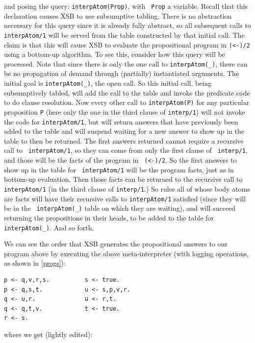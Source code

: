 \noindent and posing the query: {\tt interpAtom(Prop)}, with {\tt
  Prop} a variable.  Recall that this declaration causes XSB to use
subsumptive tabling.  There is no abstraction necessary for this query
since it is already fully abstract, so all subsequent calls to {\tt
  interpAtom/1} will be served from the table constructed by that
initial call.  The claim is that this will cause XSB to evaluate the
propositional program in {\tt (<-)/2} using a bottom-up algorithm.  To
see this, consider how this query will be processed.  Note that since
there is only the one call to {\tt interpAtom(\_)}, there can be no
propagation of demand through (partially) instantiated arguments.  The
initial goal is {\tt interpAtom(\_)}, the open call.  So this initial
call, being subsumptively tabled, will add the call to the table and
invoke the predicate code to do clause resolution.  Now every other
call to {\tt interpAtom(P)} for any particular proposition {\tt P}
(here only the one in the third clause of {\tt interp/1}) will not
invoke the code for {\tt interpAtom/1}, but will return answers that
have previously been added to the table and will suspend waiting for a
new answer to show up in the table to then be returned.  The first
answers returned cannot require a recursive call to {\tt
  interpAtom/1}, so they can come from only the first clause of {\tt
  interp/1}, and those will be the facts of the program in {\tt
  (<-)/2}.  So the first answers to show up in the table for {\tt
  interpAtom/1} will be the program facts, just as in bottom-up
evaluation.  Then those facts can be returned to the recursive call to
{\tt interpAtom/1} (in the third clause of {\tt interp/1}.)  So rules
all of whose body atoms are facts will have their recursive calls to
{\tt interpAtom/1} satisfied (since they will be in the {\tt
  interpAtom(\_)} table on which they are waiting), and will succeed
returning the propositions in their heads, to be added to the table
for {\tt interpAtom(\_)}.  And so forth.

We can see the order that XSB generates the propositional answers to
our program above by executing the above meta-interpreter (with logging
operations, as shown in \ref{progs}):

\footnotesize
\begin{verbatim}
p <- q,v,r,s.          s <- true.
p <- q,s,t.            u <- s,p,v,r.
q <- u,r.              u <- r,t.
q <- q,t,v.            t <- true.
r <- s.
\end{verbatim}
\normalsize

\noindent where we get (lightly edited):

